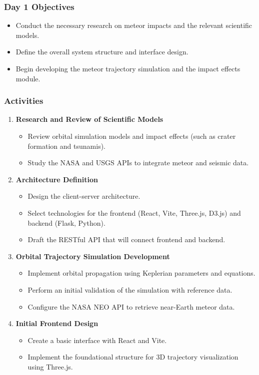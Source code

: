 \documentclass[conference]{IEEEtran}
\begin{document}
\subsubsection*{Day 1 Objectives}
\begin{itemize}
	\item Conduct the necessary research on meteor impacts and the relevant
	      scientific models.
	\item Define the overall system structure and interface design.
	\item Begin developing the meteor trajectory simulation and the impact
	      effects module.
\end{itemize}

\subsubsection*{Activities}
\begin{enumerate}
	\item \textbf{Research and Review of Scientific Models}
	      \begin{itemize}
		      \item Review orbital simulation models and impact effects (such as crater
		            formation and tsunamis).
		      \item Study the NASA and USGS APIs to integrate meteor and seismic
		            data.
	      \end{itemize}
	\item \textbf{Architecture Definition}
	      \begin{itemize}
		      \item Design the client-server architecture.
		      \item Select technologies for the frontend (React, Vite, Three.js,
		            D3.js) and backend (Flask, Python).
		      \item Draft the RESTful API that will connect frontend and backend.
	      \end{itemize}
	\item \textbf{Orbital Trajectory Simulation Development}
	      \begin{itemize}
		      \item Implement orbital propagation using Keplerian parameters and
		            equations.
		      \item Perform an initial validation of the simulation with reference
		            data.
		      \item Configure the NASA NEO API to retrieve near-Earth meteor data.
	      \end{itemize}
	\item \textbf{Initial Frontend Design}
	      \begin{itemize}
		      \item Create a basic interface with React and Vite.
		      \item Implement the foundational structure for 3D trajectory
		            visualization using Three.js.
	      \end{itemize}
\end{enumerate}
\end{document}
